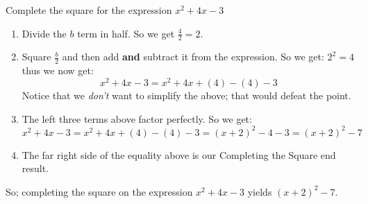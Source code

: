 \documentclass{ximera}
\begin{document}
    \begin{example}
        Complete the square for the expression $x^2 + 4x - 3$\\
        
        \begin{enumerate}
            \item Divide the $b$ term in half. So we get $\frac{4}{2} = 2$.
            \item Square $\frac{b}{2}$ and then add \textbf{and} subtract it from the expression. So we get: $2^2 = 4$ thus we now get:
            \[
                x^2 + 4x - 3 = x^2 + 4x + (4) - (4) - 3
            \]
            Notice that we \textit{don't} want to simplify the above; that would defeat the point.
            \item The left three terms above factor perfectly. So we get:
            \[
                x^2 + 4x - 3 = x^2 + 4x + (4) - (4) - 3 = (x + 2)^2 - 4 - 3 = (x + 2)^2 - 7
            \]
            \item The far right side of the equality above is our Completing the Square end result.
        \end{enumerate}
        So; completing the square on the expression $x^2 + 4x - 3$ yields $(x + 2)^2 - 7$.
    \end{example}
\end{document}
